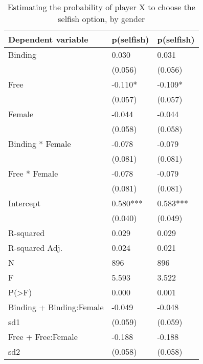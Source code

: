 \begin{table}
\centering
\caption{Estimating the probability of player X to choose the selfish option, by gender}
\label{decision_female}
\begin{tabular}{lll}
\toprule
Dependent variable & p(selfish) & p(selfish) \\
\midrule
Binding                  &      0.030 &      0.031 \\
                         &    (0.056) &    (0.056) \\
Free                     &    -0.110* &    -0.109* \\
                         &    (0.057) &    (0.057) \\
Female                   &     -0.044 &     -0.044 \\
                         &    (0.058) &    (0.058) \\
Binding * Female         &     -0.078 &     -0.079 \\
                         &    (0.081) &    (0.081) \\
Free * Female            &     -0.078 &     -0.079 \\
                         &    (0.081) &    (0.081) \\
Intercept                &   0.580*** &   0.583*** \\
                         &    (0.040) &    (0.049) \\
R-squared                &      0.029 &      0.029 \\
R-squared Adj.           &      0.024 &      0.021 \\
N                        &        896 &        896 \\
F                        &      5.593 &      3.522 \\
P(>F)                    &      0.000 &      0.001 \\
Binding + Binding:Female &     -0.049 &     -0.048 \\
sd1                      &    (0.059) &    (0.059) \\
Free + Free:Female       &     -0.188 &     -0.188 \\
sd2                      &    (0.058) &    (0.058) \\
\bottomrule
\end{tabular}
\end{table}
